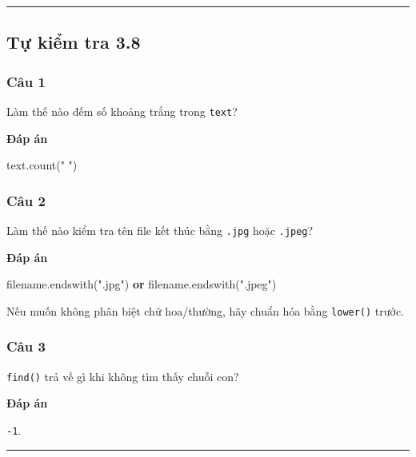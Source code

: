 \documentclass[
  11pt,
  a4paper,
]{article}
\newenvironment{Shaded}{}{}
\newcommand{\KeywordTok}[1]{\textcolor[rgb]{0.00,0.44,0.13}{\textbf{#1}}}
\newcommand{\NormalTok}[1]{#1}
\newcommand{\StringTok}[1]{\textcolor[rgb]{0.25,0.44,0.63}{#1}}
\begin{document}
\begin{center}\rule{0.5\linewidth}{0.5pt}\end{center}

\subsection{Tự kiểm tra 3.8}\label{tux1ef1-kiux1ec3m-tra-3.8}

\subsubsection{Câu 1}\label{cuxe2u-1-7}

Làm thế nào đếm số khoảng trắng trong \texttt{text}?

\textbf{Đáp án}

\begin{Shaded}
\begin{Highlighting}[]
\NormalTok{text.count(}\StringTok{" "}\NormalTok{)}
\end{Highlighting}
\end{Shaded}

\subsubsection{Câu 2}\label{cuxe2u-2-7}

Làm thế nào kiểm tra tên file kết thúc bằng \texttt{.jpg} hoặc
\texttt{.jpeg}?

\textbf{Đáp án}

\begin{Shaded}
\begin{Highlighting}[]
\NormalTok{filename.endswith(}\StringTok{".jpg"}\NormalTok{) }\KeywordTok{or}\NormalTok{ filename.endswith(}\StringTok{".jpeg"}\NormalTok{)}
\end{Highlighting}
\end{Shaded}

Nếu muốn không phân biệt chữ hoa/thường, hãy chuẩn hóa bằng
\texttt{lower()} trước.

\subsubsection{Câu 3}\label{cuxe2u-3-4}

\texttt{find()} trả về gì khi không tìm thấy chuỗi con?

\textbf{Đáp án}

\texttt{-1}.

\begin{center}\rule{0.5\linewidth}{0.5pt}\end{center}
\end{document}
